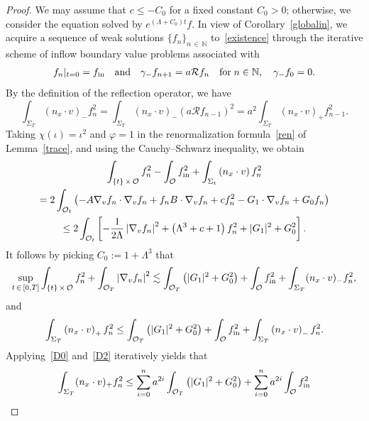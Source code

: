 \documentclass[10pt]{amsart}
\theoremstyle{definition}\newtheorem{defi}[theo]{Definition}\newtheorem{rema}[theo]{Remark}\newtheorem{exam}[theo]{Example}\newtheorem{exem}[theo]{Example}\newtheorem{nota}[theo]{Notation}
\newcommand*\fin {f_{\rm in}}
\newcommand*\N {\mathbb{N}}
\newcommand*\RR {\mathcal{R}}
\newcommand*\OO {\mathcal{O}}
\begin{document}
\begin{proof}
We may assume that $c\le -C_0$ for a fixed constant $C_0>0$; otherwise, we consider the equation solved by $e^{(\Lambda+C_0)t}f$. In view of Corollary~\ref{globalin}, we acquire a sequence of weak solutions $\{f_n\}_{n\,\in\,\N}$ to~\eqref{existence} through the iterative scheme of inflow boundary value problems associated with
\begin{align*}
f_n|_{t=0}=\fin\quad\text{and}\quad
\gamma_-f_{n+1}=a\RR f_{n}\quad\text{for}\;n\in\N, \quad
\gamma_-f_0=0.
\end{align*}
By the definition of the reflection operator, we have
\begin{equation}\label{D0}
\int_{\Sigma_T} (n_x\cdot v)_-f_n^2 = \int_{\Sigma_T} (n_x\cdot v)_-\left(a\RR f_{n-1}\right)^2 = a^2\int_{\Sigma_T} (n_x\cdot v)_+f_{n-1}^2.
\end{equation}
Taking $\chi(\iota)=\iota^2$ and $\varphi=1$ in the renormalization formula~\eqref{ren} of Lemma~\ref{trace}, and using the Cauchy--Schwarz inequality, we obtain
\begin{multline*}
\int_{\{t\}\,\times\,\OO} f_n^2 - \int_{\OO}\fin^2 + \int_{\Sigma_t} \left(n_x\cdot v\right) f_n^2 \\
=2\int_{\OO_t} \left(-A\nabla_vf_n \cdot\nabla_vf_n + f_nB\cdot\nabla_vf_n + c f_n^2 - G_1\cdot\nabla_vf_n + G_0f_n \right)\\
\le 2\int_{\OO_t} \left[-\frac{1}{2\Lambda}\left|\nabla_vf_n\right|^2 + \left(\Lambda^3+c+1\right)f_n^2 + |G_1|^2 + G_0^2\right].
\end{multline*}
It follows by picking $C_0:=1+\Lambda^3$ that
\begin{equation}\label{D1}
\sup_{t\,\in\,[0,T]}\int_{\{t\}\,\times\,\OO} f_n^2 + \int_{\OO_T} \left|\nabla_vf_n\right|^2
\lesssim \int_{\OO_T}\left(|G_1|^2 + G_0^2\right) + \int_{\OO}\fin^2 + \int_{\Sigma_T} (n_x\cdot v)_-f_n^2,
\end{equation}
and
\begin{equation}\label{D2}
\int_{\Sigma_T} \left(n_x\cdot v\right)_+f_n^2
\le \int_{\OO_T}\left(|G_1|^2 + G_0^2\right) + \int_{\OO}\fin^2 + \int_{\Sigma_T} \left(n_x\cdot v\right)_-f_n^2.
\end{equation}
Applying~\eqref{D0} and~\eqref{D2} iteratively yields that
\begin{equation}\label{Diterat}
\begin{split}
\int_{\Sigma_T} (n_x\cdot v)_+f_n^2
\le \sum_{i=0}^{n} a^{2i} \int_{\OO_T}\left(|G_1|^2 + G_0^2\right) + \sum_{i=0}^{n} a^{2i} \int_{\OO}\fin^2 &\\

\end{split}
\end{equation}
\end{proof}
\end{document}
